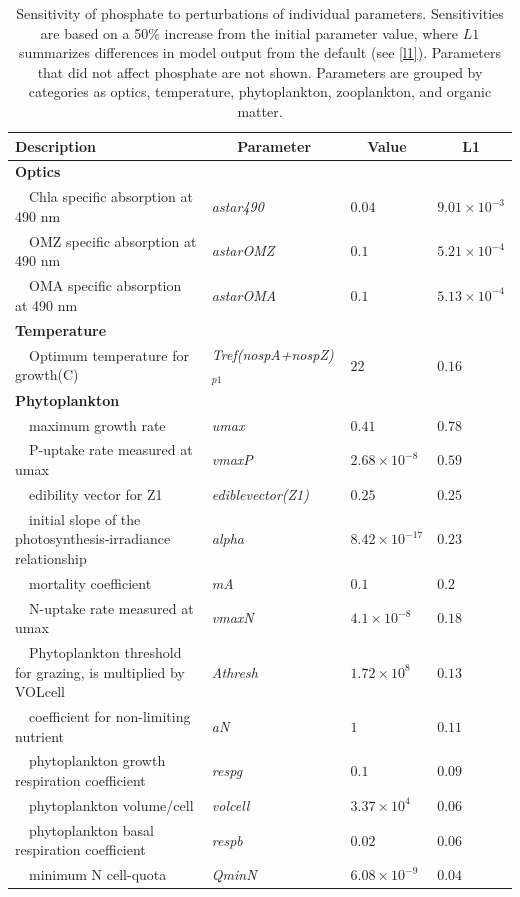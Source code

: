 \documentclass[review]{elsarticle}\usepackage[]{graphicx}\usepackage[]{color}
\begin{document}
\begin{table}[!tbp]
{\footnotesize
\caption{Sensitivity of phosphate to perturbations of individual parameters.  Sensitivities are based on a 50\% increase from the initial parameter value, where $L1$ summarizes differences in model output from the default (see \cref{l1}).  Parameters that did not affect phosphate are not shown.  Parameters are grouped by categories as optics, temperature, phytoplankton, zooplankton, and organic matter.\label{tab:po4sens}} 
\begin{center}
\begin{tabular}{llll}
\hline\hline
\multicolumn{1}{l}{Description}&\multicolumn{1}{c}{Parameter}&\multicolumn{1}{c}{Value}&\multicolumn{1}{c}{L1}\tabularnewline
\hline
{\bfseries Optics}&&&\tabularnewline
~~Chla specific absorption at 490 nm&\textit{astar490}&$0.04$&$9.01\times 10^{-3}$\tabularnewline
~~OMZ specific absorption at 490 nm&\textit{astarOMZ}&$0.1$&$5.21\times 10^{-4}$\tabularnewline
~~OMA specific absorption at 490 nm&\textit{astarOMA}&$0.1$&$5.13\times 10^{-4}$\tabularnewline
\hline
{\bfseries Temperature}&&&\tabularnewline
~~Optimum temperature for growth(C)&\textit{Tref(nospA+nospZ)$_{p1}$}&$22$&$0.16$\tabularnewline
\hline
{\bfseries Phytoplankton}&&&\tabularnewline
~~maximum growth rate&\textit{umax}&$0.41$&$0.78$\tabularnewline
~~P-uptake rate measured at umax&\textit{vmaxP}&$2.68\times 10^{-8}$&$0.59$\tabularnewline
~~edibility vector for Z1&\textit{ediblevector(Z1)}&$0.25$&$0.25$\tabularnewline
~~initial slope of the photosynthesis-irradiance relationship&\textit{alpha}&$8.42\times 10^{-17}$&$0.23$\tabularnewline
~~mortality coefficient&\textit{mA}&$0.1$&$0.2$\tabularnewline
~~N-uptake rate measured at umax&\textit{vmaxN}&$4.1\times 10^{-8}$&$0.18$\tabularnewline
~~Phytoplankton threshold for grazing, is multiplied by VOLcell&\textit{Athresh}&$1.72\times 10^{8}$&$0.13$\tabularnewline
~~coefficient for non-limiting nutrient&\textit{aN}&$1$&$0.11$\tabularnewline
~~phytoplankton growth respiration coefficient&\textit{respg}&$0.1$&$0.09$\tabularnewline
~~phytoplankton volume/cell&\textit{volcell}&$3.37\times 10^{4}$&$0.06$\tabularnewline
~~phytoplankton basal respiration coefficient&\textit{respb}&$0.02$&$0.06$\tabularnewline
~~minimum N cell-quota&\textit{QminN}&$6.08\times 10^{-9}$&$0.04$\tabularnewline

\end{tabular}
\end{center}}
\end{table}
\end{document}
